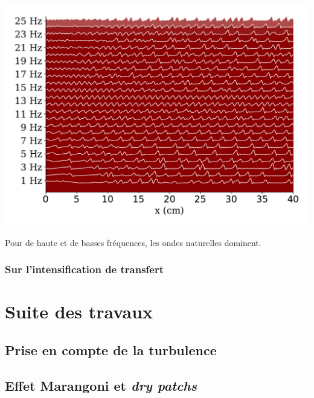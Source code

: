 \documentclass[a0,portrait,11pt]{a0poster}
\begin{document}
\begin{multicols}{2}
\begin{multicols}{2}
    \begin{center}
        \includegraphics[width=0.98\columnwidth]{01-frequency_effect}
        \label{fig:thermal}
    \end{center}

    Pour de haute et de basses fréquences, les ondes naturelles dominent.
    \columnbreak

    \subsubsection*{Sur l'intensification de transfert}
\end{multicols}

\section*{Suite des travaux}

\begin{multicols}{2}
    \subsection*{Prise en compte de la turbulence}

    \columnbreak

    \subsection*{Effet Marangoni et \emph{dry patchs}}
\end{multicols}

\end{multicols}
\end{document}

